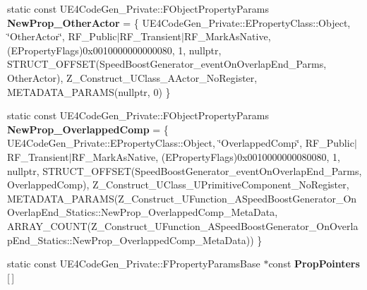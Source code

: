 \begin{DoxyCompactItemize}
static const U\+E4\+Code\+Gen\+\_\+\+Private\+::\+F\+Object\+Property\+Params {\bfseries New\+Prop\+\_\+\+Other\+Actor} = \{ U\+E4\+Code\+Gen\+\_\+\+Private\+::\+E\+Property\+Class\+::\+Object, \char`\"{}Other\+Actor\char`\"{}, R\+F\+\_\+\+Public$\vert$R\+F\+\_\+\+Transient$\vert$R\+F\+\_\+\+Mark\+As\+Native, (E\+Property\+Flags)0x0010000000000080, 1, nullptr, S\+T\+R\+U\+C\+T\+\_\+\+O\+F\+F\+S\+E\+T(\+Speed\+Boost\+Generator\+\_\+event\+On\+Overlap\+End\+\_\+\+Parms, Other\+Actor), Z\+\_\+\+Construct\+\_\+\+U\+Class\+\_\+\+A\+Actor\+\_\+\+No\+Register, M\+E\+T\+A\+D\+A\+T\+A\+\_\+\+P\+A\+R\+A\+M\+S(nullptr, 0) \}
\item 
\mbox{\label{struct_z___construct___u_function___a_speed_boost_generator___on_overlap_end___statics_a5df896152093499e5c40416f1f67a9c7}} 
static const U\+E4\+Code\+Gen\+\_\+\+Private\+::\+F\+Object\+Property\+Params {\bfseries New\+Prop\+\_\+\+Overlapped\+Comp} = \{ U\+E4\+Code\+Gen\+\_\+\+Private\+::\+E\+Property\+Class\+::\+Object, \char`\"{}Overlapped\+Comp\char`\"{}, R\+F\+\_\+\+Public$\vert$R\+F\+\_\+\+Transient$\vert$R\+F\+\_\+\+Mark\+As\+Native, (E\+Property\+Flags)0x0010000000080080, 1, nullptr, S\+T\+R\+U\+C\+T\+\_\+\+O\+F\+F\+S\+E\+T(\+Speed\+Boost\+Generator\+\_\+event\+On\+Overlap\+End\+\_\+\+Parms, Overlapped\+Comp), Z\+\_\+\+Construct\+\_\+\+U\+Class\+\_\+\+U\+Primitive\+Component\+\_\+\+No\+Register, M\+E\+T\+A\+D\+A\+T\+A\+\_\+\+P\+A\+R\+A\+M\+S(\+Z\+\_\+\+Construct\+\_\+\+U\+Function\+\_\+\+A\+Speed\+Boost\+Generator\+\_\+\+On\+Overlap\+End\+\_\+\+Statics\+::\+New\+Prop\+\_\+\+Overlapped\+Comp\+\_\+\+Meta\+Data, A\+R\+R\+A\+Y\+\_\+\+C\+O\+U\+N\+T(\+Z\+\_\+\+Construct\+\_\+\+U\+Function\+\_\+\+A\+Speed\+Boost\+Generator\+\_\+\+On\+Overlap\+End\+\_\+\+Statics\+::\+New\+Prop\+\_\+\+Overlapped\+Comp\+\_\+\+Meta\+Data)) \}
\item 
static const U\+E4\+Code\+Gen\+\_\+\+Private\+::\+F\+Property\+Params\+Base $\ast$const {\bfseries Prop\+Pointers} \mbox{[}$\,$\mbox{]}
\item 
\mbox{\label{struct_z___construct___u_function___a_speed_boost_generator___on_overlap_end___statics_a4e9d3e079edc09d5c9a5d7c7d938717d}} 

\end{DoxyCompactItemize}
